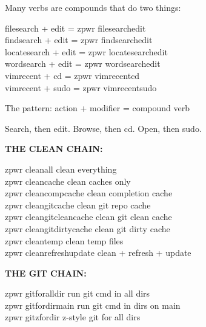 \documentclass[11pt,a4paper,twoside]{book}
\begin{document}
Many verbs are compounds that do two things:

\begin{codebox}
filesearch + edit     = zpwr filesearchedit\\
findsearch + edit     = zpwr findsearchedit\\
locatesearch + edit   = zpwr locatesearchedit\\
wordsearch + edit     = zpwr wordsearchedit\\
vimrecent + cd        = zpwr vimrecentcd\\
vimrecent + sudo      = zpwr vimrecentsudo\\
\end{codebox}

The pattern: action + modifier = compound verb

Search, then edit. Browse, then cd. Open, then sudo.


\vspace{12pt}
{\bfseries\color{neonyellow} THE CLEAN CHAIN:}\vspace{4pt}

\begin{codebox}
zpwr cleanall             clean everything\\
zpwr cleancache           clean caches only\\
zpwr cleancompcache       clean completion cache\\
zpwr cleangitcache        clean git repo cache\\
zpwr cleangitcleancache   clean git clean cache\\
zpwr cleangitdirtycache   clean git dirty cache\\
zpwr cleantemp            clean temp files\\
zpwr cleanrefreshupdate   clean + refresh + update\\
\end{codebox}


\vspace{12pt}
{\bfseries\color{neonyellow} THE GIT CHAIN:}\vspace{4pt}

\begin{codebox}
zpwr gitforalldir     run git cmd in all dirs\\
zpwr gitfordirmain    run git cmd in dirs on main\\
zpwr gitzfordir       z-style git for all dirs\\
\end{codebox}
\end{document}
